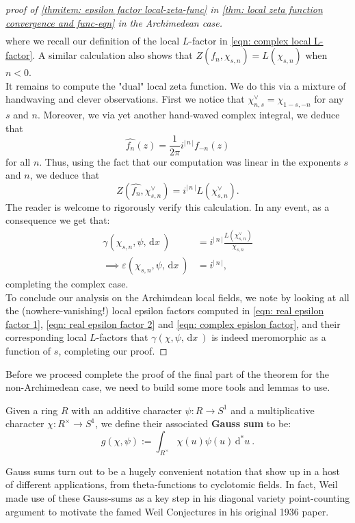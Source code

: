 \documentclass[11pt, x11names, openany]{book}
\newcommand{\abs}[1]{\left| \, #1  \,\right|}
\renewcommand{\hat}{\widehat}
\newcommand{\dx}{\, \mathrm{d}x \ }
\renewcommand{\d}[1]{\, \mathrm{d}#1 \ }
\begin{document}
\begin{proof}[proof of \ref{thmitem: epsilon factor local-zeta-func} in \ref{thm: local zeta function convergence and func-eqn} in the Archimedean case]
\begin{align*}
\end{align*}
where we recall our definition of the local $L$-factor in \ref{eqn: complex local L-factor}. A similar calculation also shows that $Z(f_n, \chi_{s, n}) = L(\chi_{s, n})$ when $n < 0$.\\
It remains to compute the "dual" local zeta function. We do this via a mixture of handwaving and clever observations. First we notice that $\chi^\lor_{n, s} = \chi_{1-s, -n}$ for any $s$ and $n$. Moreover, we via yet another hand-waved complex integral, we deduce that
\begin{equation*}
    \hat{f_n}(z) = \frac{1}{2\pi} i^{\abs{n}}f_{-n}(z)
\end{equation*}
for all $n$. Thus, using the fact that our computation was linear in the exponents $s$ and $n$, we deduce that
\begin{equation*}
    Z(\hat{f_n}, \chi^\lor_{s, n})  = i^{\abs{n}}L(\chi^\lor_{s, n}).
\end{equation*}
The reader is welcome to rigorously verify this calculation. In any event, as a consequence we get that:
\begin{align*}
    \label{eqn: complex epislon factor}
    \gamma(\chi_{s, n}, \psi, \dx) &= i^{\abs{n}} \frac{L(\chi^\lor_{s, n})}{\chi_{s, n}}\\
    \implies  \varepsilon(\chi_{s, n}, \psi, \dx) &= i^{\abs{n}},
\end{align*}
completing the complex case.\\

To conclude our analysis on the Archimdean local fields, we note by looking at all the (nowhere-vanishing!) local epsilon factors computed in \ref{eqn: real epsilon factor 1}, \ref{eqn: real epsilon factor 2} and \ref{eqn: complex epislon factor}, and their corresponding local $L$-factors that $\gamma(\chi, \psi, \dx)$ is indeed meromorphic as a function of $s$, completing our proof.
\end{proof}

Before we proceed complete the proof of the final part of the theorem for the non-Archimedean case, we need to build some more tools and lemmas to use.
\begin{defn}
    \label{def: Gauss sum}
    Given a ring $R$ with an additive character $\psi: R \to S^1$ and a multiplicative character $\chi: R^\times \to S^1$, we define their associated \textbf{Gauss sum} to be:
    \begin{equation*}
        g(\chi, \psi) := \int_{R^\times} \chi(u) \psi(u) \d{^*u}.
    \end{equation*}
    \end{defn}
    \begin{remark}
        Gauss sums turn out to be a hugely convenient notation that show up in a host of different applications, from theta-functions to cyclotomic fields. In fact, Weil made use of these Gauss-sums as a key step in his diagonal variety point-counting argument to motivate the famed Weil Conjectures in his original 1936 paper.
    \end{remark}
\end{document}
